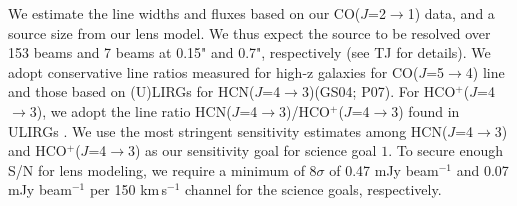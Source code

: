 \documentclass[12pt,a4paper]{article}
\newcommand{\LIR}{\mbox{$L_{\rm IR}$}\xspace}
\newcommand{\rarr}{$\rightarrow$}
\newcommand{\bco}{\mbox{CO($J$=2\rarr1)}\xspace}
\newcommand{\eco}{\mbox{CO($J$=5\rarr4)}\xspace}
\newcommand{\dhcn}{HCN($J$=4\rarr3)\xspace}
\newcommand{\hcop}{HCO$^+$\xspace}
\newcommand{\dhcop}{HCO$^+$($J$=4\rarr3)\xspace}
\newcommand{\kms}{km\,s$^{-1}$\xspace}
\newcommand{\pmOne}{\mbox{$^{-1}$}\xspace}
\begin{document}
We estimate the line widths and fluxes 
based on our \bco data, and a source size from our lens model.
We thus expect the source to be resolved over 153 beams 
and 7 beams at 0.15" and 0.7", respectively (see TJ for details). 
We adopt conservative 
line ratios measured for high-z galaxies for \eco line \citep[][]{CW13}
and those based on (U)LIRGs for \dhcn (GS04; P07).
For \dhcop, we adopt the line ratio \dhcn/\dhcop found in ULIRGs 
\citep{Greve09a}. 
We use the most stringent sensitivity estimates 
among \dhcn and \dhcop as our sensitivity goal for science goal $1$. %
To secure enough S/N for lens modeling, 
we require a minimum of 8$\sigma$ of 0.47 mJy beam\pmOne and 0.07 mJy beam\pmOne
per 150 \kms channel 
for the science goals, respectively. 

\end{document}
